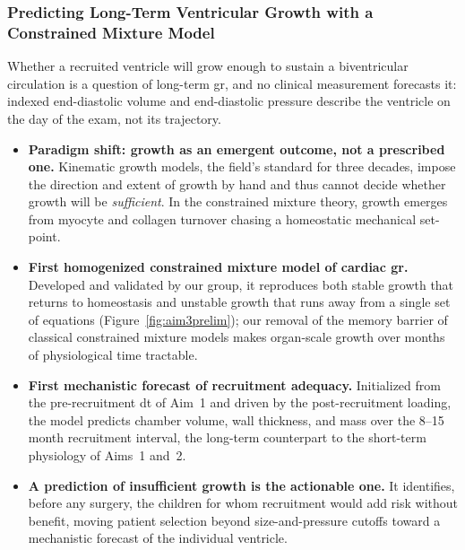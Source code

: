 \subsubsection{Predicting Long-Term Ventricular Growth with a Constrained Mixture Model}

Whether a recruited ventricle will grow enough to sustain a biventricular circulation is a question of long-term \gls*{gr}, and no clinical measurement forecasts it: indexed end-diastolic volume and end-diastolic pressure describe the ventricle on the day of the exam, not its trajectory.

\begin{itemize}
\item \textbf{Paradigm shift: growth as an emergent outcome, not a prescribed one.} Kinematic growth models, the field's standard for three decades, impose the direction and extent of growth by hand and thus cannot decide whether growth will be \emph{sufficient}. In the constrained mixture theory, growth emerges from myocyte and collagen turnover chasing a homeostatic mechanical set-point.

\item \textbf{First homogenized constrained mixture model of cardiac \gls*{gr}.} Developed and validated by our group, it reproduces both stable growth that returns to homeostasis and unstable growth that runs away from a single set of equations (Figure~\ref{fig:aim3prelim}); our removal of the memory barrier of classical constrained mixture models makes organ-scale growth over months of physiological time tractable.

\item \textbf{First mechanistic forecast of recruitment adequacy.} Initialized from the pre-recruitment \gls*{dt} of Aim~1 and driven by the post-recruitment loading, the model predicts chamber volume, wall thickness, and mass over the 8--15 month recruitment interval, the long-term counterpart to the short-term physiology of Aims~1 and~2.

\item \textbf{A prediction of insufficient growth is the actionable one.} It identifies, before any surgery, the children for whom recruitment would add risk without benefit, moving patient selection beyond size-and-pressure cutoffs toward a mechanistic forecast of the individual ventricle.
\end{itemize}
